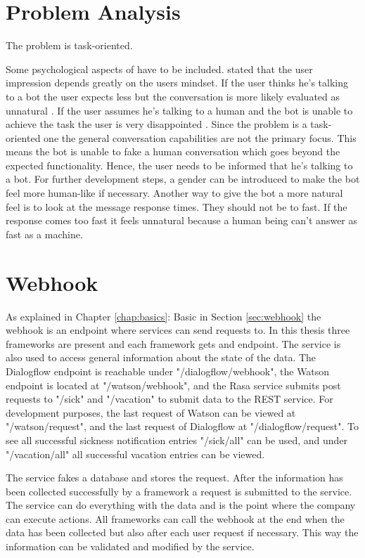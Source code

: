 \section{Problem Analysis}
The problem is task-oriented.

Some psychological aspects of \citet{brandtzaeg2018chatbots} have to be included.
\citet{brandtzaeg2018chatbots} stated that the user impression depends greatly on the users mindset.
If the user thinks he's talking to a bot the user expects less but the conversation is more likely evaluated as unnatural \cite{brandtzaeg2018chatbots}. If the user assumes he's talking to a human and the bot is unable to achieve the task the user is very disappointed \cite{brandtzaeg2018chatbots}.
Since the problem is a task-oriented one the general conversation capabilities are not the primary focus.
This means the bot is unable to fake a human conversation which goes beyond the expected functionality.
Hence, the user needs to be informed that he's talking to a bot.
For further development steps, a gender can be introduced to make the bot feel more human-like if necessary.
Another way to give the bot a more natural feel is to look at the message response times.
They should not be to fast.
If the response comes too fast it feels unnatural because a human being can't answer as fast as a machine.

\section{Webhook}
As explained in Chapter \ref{chap:basics}: Basic in Section \ref{sec:webhook} 
the webhook is an endpoint where services can send requests to.
In this thesis three frameworks are present and each framework gets and endpoint.
The service is also used to access general information about the state of the data.
The Dialogflow endpoint is reachable under "/dialogflow/webhook",
the Watson endpoint is located at "/watson/webhook",
and the Rasa service submits post requests to "/sick" and "/vacation" to submit data 
to the REST service.
For development purposes, the last request of Watson can be viewed at "/watson/request",
and the last request of Dialogflow at "/dialogflow/request".
To see all successful sickness notification entries "/sick/all" can be used,
and under "/vacation/all" all successful vacation entries can be viewed.

The service fakes a database and stores the request.
After the information has been collected successfully by a framework a 
request is submitted to the service.
The service can do everything with the data and is the point where the company can execute actions.
All frameworks can call the webhook at the end when the data has been collected but also 
after each user request if necessary.
This way the information can be validated and modified by the service.




